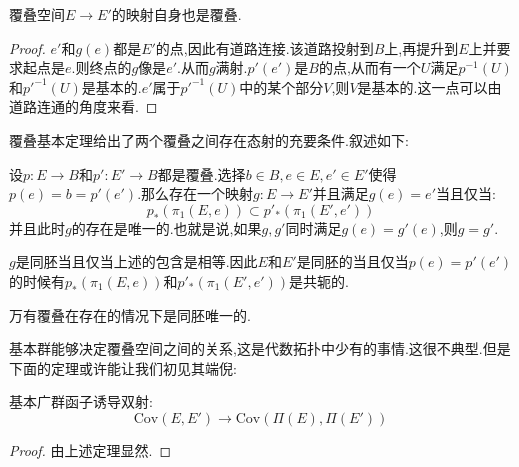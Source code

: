 \begin{lemma}
    覆叠空间$E \to E'$的映射自身也是覆叠.
\end{lemma}
\begin{proof}
    $e'$和$g(e)$都是$E'$的点,因此有道路连接.该道路投射到$B$上,再提升到$E$上并要求起点是$e$.则终点的$g$像是$e'$.从而$g$满射.$p'(e')$是$B$的点,从而有一个$U$满足$p^{-1}(U)$和$p'^{-1}(U)$是基本的.$e'$属于$p'^{-1}(U)$中的某个部分$V$,则$V$是基本的.这一点可以由道路连通的角度来看.
\end{proof}

覆叠基本定理给出了两个覆叠之间存在态射的充要条件.叙述如下:
      
\begin{theorem}
        设$p:E\to B$和$p':E' \to B$都是覆叠.选择$b \in B,e \in E,e'\in E'$使得$p(e)=b=p'(e')$.那么存在一个映射$g:E\to E'$并且满足$g(e)=e'$当且仅当:
        $$
        p_*(\pi_1(E,e)) \subset p'_*(\pi_1(E',e')) 
        $$  
        并且此时$g$的存在是唯一的.也就是说,如果$g,g'$同时满足$g(e)=g'(e)$,则$g=g'$.
        
        $g$是同胚当且仅当上述的包含是相等.因此$E$和$E'$是同胚的当且仅当$p(e)=p'(e')$的时候有$p_*(\pi_1(E,e))$和$p'_*(\pi_1(E',e'))$是共轭的.
\end{theorem}
\begin{corollary}
    万有覆叠在存在的情况下是同胚唯一的.
\end{corollary}

基本群能够决定覆叠空间之间的关系,这是代数拓扑中少有的事情.这很不典型.但是下面的定理或许能让我们初见其端倪:
\begin{theorem}
    基本广群函子诱导双射:
    $$
    \mathrm{Cov}(E,E') \to \mathrm{Cov}(\Pi(E),\Pi(E'))
    $$
\end{theorem}
\begin{proof}
    由上述定理显然.
\end{proof}

